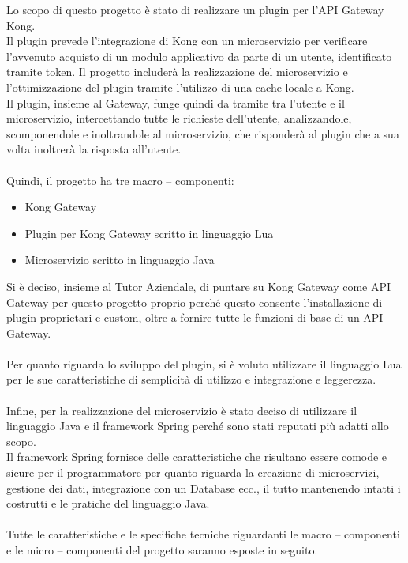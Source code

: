 Lo scopo di questo progetto è stato di realizzare un plugin per l'API Gateway Kong.\\
Il plugin prevede l'integrazione di Kong con un microservizio per verificare l'avvenuto acquisto di un modulo applicativo da parte di un utente, identificato tramite token.
Il progetto includerà la realizzazione del microservizio e l'ottimizzazione del plugin tramite l'utilizzo di una cache locale a Kong.\\
Il plugin, insieme al Gateway, funge quindi da tramite tra l'utente e il microservizio, intercettando tutte le richieste dell'utente, analizzandole, scomponendole e 
inoltrandole al microservizio, che risponderà al plugin che a sua volta inoltrerà la risposta all'utente.\\ \\
Quindi, il progetto ha tre macro – componenti:
\begin{itemize}
\item Kong Gateway
\item Plugin per Kong Gateway scritto in linguaggio Lua
\item Microservizio scritto in linguaggio Java
\end{itemize}

Si è deciso, insieme al Tutor Aziendale, di puntare su Kong Gateway come API Gateway per questo progetto proprio perché questo consente l'installazione di plugin 
proprietari e custom, oltre a fornire tutte le funzioni di base di un API Gateway.\\ \\
Per quanto riguarda lo sviluppo del plugin, si è voluto utilizzare il linguaggio Lua per le sue caratteristiche di semplicità di utilizzo e integrazione e leggerezza.\\ \\

Infine, per la realizzazione del microservizio è stato deciso di utilizzare il linguaggio Java e il framework Spring perché sono stati reputati più adatti allo scopo.\\
Il framework Spring fornisce delle caratteristiche che risultano essere comode e sicure per il programmatore per quanto riguarda la creazione di microservizi, 
gestione dei dati, integrazione con un Database ecc., il tutto mantenendo intatti i costrutti e le pratiche del linguaggio Java.
\\ \\
Tutte le caratteristiche e le specifiche tecniche riguardanti le macro – componenti e le micro – componenti del progetto saranno esposte in seguito.

